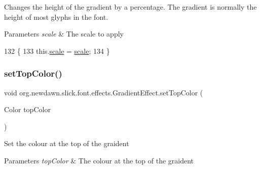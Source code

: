 Changes the height of the gradient by a percentage. The gradient is normally the height of most glyphs in the font.


\begin{DoxyParams}{Parameters}
{\em scale} & The scale to apply \\
\hline
\end{DoxyParams}

\begin{DoxyCode}
132                                        \{
133         this.\mbox{\hyperlink{classorg_1_1newdawn_1_1slick_1_1font_1_1effects_1_1_gradient_effect_aa2b56ea1a52119215a041ac8328abcec}{scale}} = \mbox{\hyperlink{classorg_1_1newdawn_1_1slick_1_1font_1_1effects_1_1_gradient_effect_aa2b56ea1a52119215a041ac8328abcec}{scale}};
134     \}
\end{DoxyCode}
\mbox{\label{classorg_1_1newdawn_1_1slick_1_1font_1_1effects_1_1_gradient_effect_a3d206a5fccf9d93ca7a08c23b5bb1a2e}} 
\subsubsection{\texorpdfstring{set\+Top\+Color()}{setTopColor()}}
{\footnotesize\ttfamily void org.\+newdawn.\+slick.\+font.\+effects.\+Gradient\+Effect.\+set\+Top\+Color (\begin{DoxyParamCaption}\item[{Color}]{top\+Color }\end{DoxyParamCaption})\hspace{0.3cm}{\ttfamily [inline]}}

Set the colour at the top of the graident


\begin{DoxyParams}{Parameters}
{\em top\+Color} & The colour at the top of the graident \\
\hline
\end{DoxyParams}

